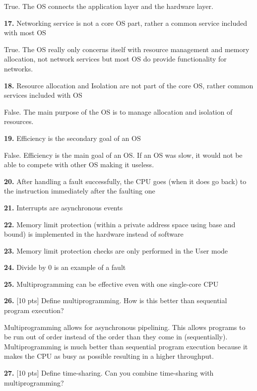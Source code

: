 \documentclass[12pt]{article}
\begin{document}
True. The OS connects the application layer and the hardware layer. 

{\bf 17.} Networking service is not a core OS part, rather a common service included with most OS

True. The OS really only concerns itself with resource management and memory allocation, not network services but most OS do provide functionality for networks. 

{\bf 18.} Resource allocation and Isolation are not part of the core OS, rather common services
included with OS

False. The main purpose of the OS is to manage allocation and isolation of resources. 

{\bf 19.} Efficiency is the secondary goal of an OS

False. Efficiency is the main goal of an OS. If an OS was slow, it would not be able to compete with other OS making it useless. 

{\bf 20.} After handling a fault successfully, the CPU goes (when it does go back) to the instruction
immediately after the faulting one



{\bf 21.} Interrupts are asynchronous events

{\bf 22.} Memory limit protection (within a private address space using base and bound) is
implemented in the hardware instead of software

{\bf 23.} Memory limit protection checks are only performed in the User mode

{\bf 24.} Divide by 0 is an example of a fault

{\bf 25.} Multiprogramming can be effective even with one single-core CPU

{\bf 26.} [10 pts] Define multiprogramming. How is this better than sequential program execution?

Multiprogramming allows for asynchronous pipelining. This allows programs to be run out of order instead of the order than they come in (sequentially). Multiprogramming is much better than sequential program execution because it makes the CPU as busy as possible resulting in a higher throughput. 

{\bf 27.} [10 pts] Define time-sharing. Can you combine time-sharing with multiprogramming?
\end{document}
